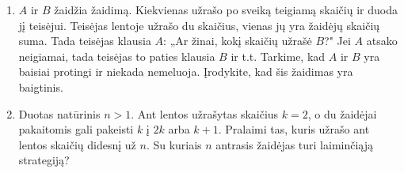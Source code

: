 \begin{enumerate}
  \item {} $A$ ir $B$ žaidžia žaidimą. Kiekvienas
    užrašo po sveiką teigiamą skaičių ir duoda jį teisėjui. Teisėjas lentoje
    užrašo du skaičius, vienas jų yra žaidėjų skaičių suma. Tada teisėjas
    klausia $A$: „Ar žinai, kokį skaičių užrašė $B$?" Jei $A$ atsako
    neigiamai, tada teisėjas to paties klausia $B$ ir t.t. Tarkime, kad $A$
    ir $B$ yra baisiai protingi ir niekada nemeluoja. Įrodykite, kad šis
    žaidimas yra baigtinis.

  \item {} Duotas natūrinis $n>1$. Ant lentos užrašytas
    skaičius $k=2$, o du žaidėjai pakaitomis gali pakeisti $k$ į $2k$ arba $k+1$.
    Pralaimi tas, kuris užrašo ant lentos skaičių didesnį už $n$. Su kuriais $n$
    antrasis žaidėjas turi laiminčiąją strategiją?


\end{enumerate}

